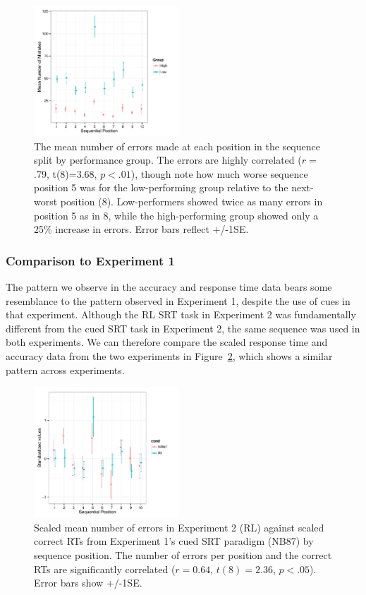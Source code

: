 \documentclass[man,floatsintext]{apa6}
\begin{document}
\begin{figure}[!h]
  \centering
  \includegraphics[width=0.48\textwidth]{figures/RL_mistakes_by_seqpos}
  \caption{The mean number of errors made at each position in the sequence split by performance group. The errors are highly correlated ($r=$.79, t(8)=3.68, $p<.01$), though note how much worse sequence position 5 was for the low-performing group relative to the next-worst position (8). Low-performers showed twice as many errors in position 5 as in 8, while the high-performing group showed only a 25\% increase in errors. Error bars reflect +/-1SE.}
  \label{fig:mistakes-seqpos}
\end{figure}
 
\subsubsection{Comparison to Experiment 1}

The pattern we observe in the accuracy and response time data bears some resemblance to the pattern observed in Experiment 1, despite the use of cues in that experiment. Although the RL SRT task in Experiment 2 was fundamentally different from the cued SRT task in Experiment 2, the same sequence was used in both experiments. We can therefore compare the scaled response time and accuracy data from the two experiments in Figure~\ref{fig:RLvsNB}, which shows a similar pattern across experiments.

\begin{figure}[!h]
  \centering
  \includegraphics[width=0.48\textwidth]{figures/RLvsNB_RTvsMis_seqpos}
  \caption{Scaled mean number of errors in Experiment 2 (RL) against scaled correct RTs from Experiment 1's cued SRT paradigm (NB87) by sequence position. The number of errors per position and the correct RTs are significantly correlated ($r=0.64$, $t(8)=2.36$, $p<.05$). Error bars show +/-1SE.}
  \label{fig:RLvsNB}
\end{figure}
\end{document}
